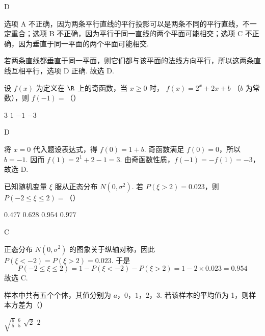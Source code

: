 \begin{answer}
D
\end{answer}

\begin{solution}
选项 A 不正确，因为两条平行直线的平行投影可以是两条不同的平行直线，不一定重合；选项 B 不正确，因为平行于同一直线的两个平面可能相交；选项 C 不正确，因为垂直于同一平面的两个平面可能相交.

若两条直线都垂直于同一平面，则它们都与该平面的法线方向平行，所以这两条直线互相平行，选项 D 正确. 故选 D.
\end{solution}

\begin{problem}
设 \( f(x) \) 为定义在 \(\R\) 上的奇函数，当 \( x \geqslant 0 \) 时， \( f(x) = 2^{x} + 2x + b \) （\(b\) 为常数），则 \( f(-1) = \)（\quad）

\choices
    {\(3\)}
    {\(1\)}
    {\(-1\)}
    {\(-3\)}
\end{problem}

\begin{answer}
D
\end{answer}

\begin{solution}
将 \(x=0\) 代入题设表达式，得 \(f(0)=1+b\). 奇函数满足 \(f(0)=0\)，所以 \(b=-1\). 因而 \(f(1)=2^1+2-1=3\). 由奇函数性质，\(f(-1)=-f(1)=-3\)，故选 D.
\end{solution}

\begin{problem}
已知随机变量 \(\xi\) 服从正态分布 \(N(0, \sigma^2)\). 若 \(P(\xi > 2) = 0.023\)，则 \(P(-2 \leqslant \xi \leqslant 2) =\)（\quad）

\choices
    {\(0.477\)}
    {\(0.628\)}
    {\(0.954\)}
    {\(0.977\)}
\end{problem}

\begin{answer}
C
\end{answer}

\begin{solution}
正态分布 \(N(0,\sigma^2)\) 的图象关于纵轴对称，因此 \(P(\xi<-2)=P(\xi>2)=0.023\). 于是
\[
P(-2\leqslant\xi\leqslant2)=1-P(\xi<-2)-P(\xi>2)=1-2\times0.023=0.954
\]
故选 C.
\end{solution}

\begin{problem}
样本中共有五个个体，其值分别为 \(a\)，\(0\)，\(1\)，\(2\)，\(3\). 若该样本的平均值为 1，则样本方差为（\quad）

\choices
    {\(\sqrt{\frac{6}{5}}\)}
    {\(\frac{6}{5}\)}
    {\(\sqrt{2}\)}
    {\(2\)}
\end{problem}

